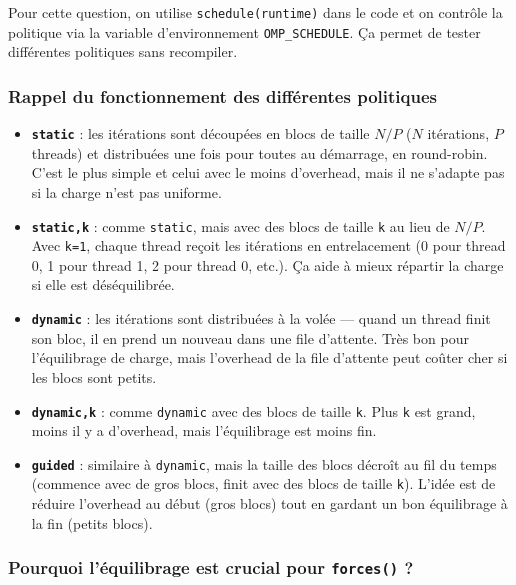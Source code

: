 \documentclass[12pt,a4paper]{article}
\begin{document}
Pour cette question, on utilise \texttt{schedule(runtime)} dans le code et on contrôle la politique via la variable d'environnement \texttt{OMP\_SCHEDULE}. Ça permet de tester différentes politiques sans recompiler.

\subsubsection{Rappel du fonctionnement des différentes politiques}

\begin{itemize}[leftmargin=2em]
  \item \textbf{\textcolor{deeporange}{\texttt{static}}} : les itérations sont découpées en blocs de taille $N/P$ ($N$ itérations, $P$ threads) et distribuées une fois pour toutes au démarrage, en round-robin. C'est le plus simple et celui avec le moins d'overhead, mais il ne s'adapte pas si la charge n'est pas uniforme.
  \item \textbf{\textcolor{deeporange}{\texttt{static,k}}} : comme \texttt{static}, mais avec des blocs de taille \texttt{k} au lieu de $N/P$. Avec \texttt{k=1}, chaque thread reçoit les itérations en entrelacement (0 pour thread 0, 1 pour thread 1, 2 pour thread 0, etc.). Ça aide à mieux répartir la charge si elle est déséquilibrée.
  \item \textbf{\textcolor{deeporange}{\texttt{dynamic}}} : les itérations sont distribuées à la volée --- quand un thread finit son bloc, il en prend un nouveau dans une file d'attente. Très bon pour l'équilibrage de charge, mais l'overhead de la file d'attente peut coûter cher si les blocs sont petits.
  \item \textbf{\textcolor{deeporange}{\texttt{dynamic,k}}} : comme \texttt{dynamic} avec des blocs de taille \texttt{k}. Plus \texttt{k} est grand, moins il y a d'overhead, mais l'équilibrage est moins fin.
  \item \textbf{\textcolor{deeporange}{\texttt{guided}}} : similaire à \texttt{dynamic}, mais la taille des blocs décroît au fil du temps (commence avec de gros blocs, finit avec des blocs de taille \texttt{k}). L'idée est de réduire l'overhead au début (gros blocs) tout en gardant un bon équilibrage à la fin (petits blocs).
\end{itemize}

\subsubsection{Pourquoi l'équilibrage est crucial pour \texttt{forces()} ?}
\end{document}
